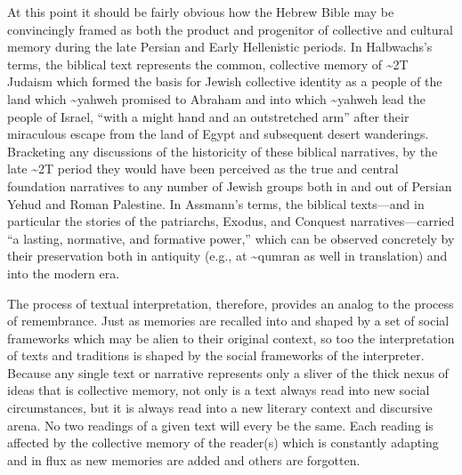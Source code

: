 At this point it should be fairly obvious how the Hebrew Bible may be
convincingly framed as both the product and progenitor of collective and
cultural memory during the late Persian and Early Hellenistic periods.
In Halbwachs's terms, the biblical text represents the common,
collective memory of \textasciitilde{}2T Judaism which formed the basis
for Jewish collective identity as a people of the land which
\textasciitilde{}yahweh promised to Abraham and into which
\textasciitilde{}yahweh lead the people of Israel, ``with a might hand
and an outstretched arm'' after their miraculous escape from the land of
Egypt and subsequent desert wanderings. Bracketing any discussions of
the historicity of these biblical narratives, by the late
\textasciitilde{}2T period they would have been perceived as the true
and central foundation narratives to any number of Jewish groups both in
and out of Persian Yehud and Roman Palestine. In Assmann's terms, the
biblical texts---and in particular the stories of the patriarchs,
Exodus, and Conquest narratives---carried ``a lasting, normative, and
formative power,''\autocite[38]{assmann2011} which can be observed
concretely by their preservation both in antiquity (e.g., at
\textasciitilde{}qumran as well in translation) and into the modern era.

The process of textual interpretation, therefore, provides an analog to
the process of remembrance. Just as memories are recalled into and
shaped by a set of social frameworks which may be alien to their
original context, so too the interpretation of texts and traditions is
shaped by the social frameworks of the interpreter. Because any single
text or narrative represents only a sliver of the thick nexus of ideas
that is collective memory, not only is a text always read into new
social circumstances, but it is always read into a new literary context
and discursive arena. No two readings of a given text will every be the
same. Each reading is affected by the collective memory of the reader(s)
which is constantly adapting and in flux as new memories are added and
others are forgotten.

